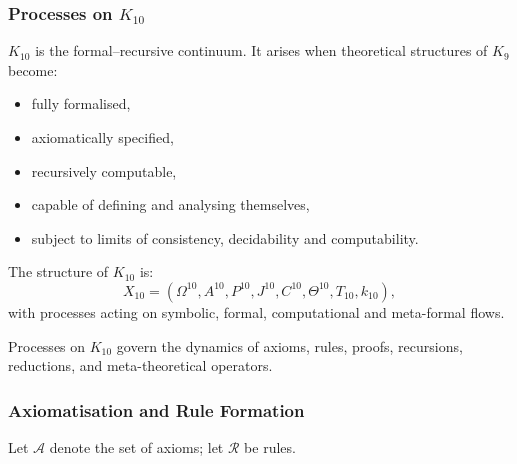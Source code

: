 

\subsubsection{Processes on $K_{10}$}
\label{sec:processes-k10}

$K_{10}$ is the formal–recursive continuum.
It arises when theoretical structures of $K_{9}$ become:
\begin{itemize}
    \item fully formalised,
    \item axiomatically specified,
    \item recursively computable,
    \item capable of defining and analysing themselves,
    \item subject to limits of consistency, decidability and computability.
\end{itemize}

The structure of $K_{10}$ is:
\[
X_{10} = (\Omega^{10}, A^{10}, P^{10}, J^{10}, C^{10},
          \Theta^{10}, T_{10}, k_{10}),
\]
with processes acting on symbolic, formal, computational and meta-formal flows.

Processes on $K_{10}$ govern the dynamics of axioms, rules, proofs,
recursions, reductions, and meta-theoretical operators.

\subsubsection{Axiomatisation and Rule Formation}

Let $\mathcal{A}$ denote the set of axioms; let $\mathcal{R}$ be rules.

